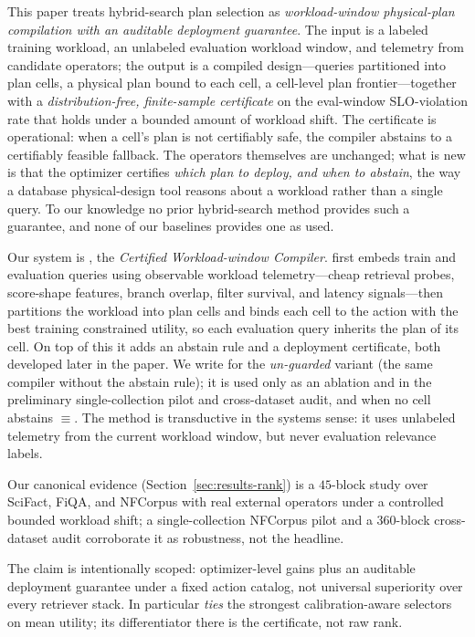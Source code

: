 This paper treats hybrid-search plan selection as \emph{workload-window physical-plan compilation with an auditable deployment guarantee}. The input is a labeled training workload, an unlabeled evaluation workload window, and telemetry from candidate operators; the output is a compiled design---queries partitioned into plan cells, a physical plan bound to each cell, a cell-level plan frontier---together with a \emph{distribution-free, finite-sample certificate} on the eval-window SLO-violation rate that holds under a bounded amount of workload shift. The certificate is operational: when a cell's plan is not certifiably safe, the compiler abstains to a certifiably feasible fallback. The operators themselves are unchanged; what is new is that the optimizer certifies \emph{which plan to deploy, and when to abstain}, the way a database physical-design tool reasons about a workload rather than a single query. To our knowledge no prior hybrid-search method provides such a guarantee, and none of our baselines provides one as used.

Our system is \CWC{}, the \emph{Certified Workload-window Compiler}. \CWC{} first embeds train and evaluation queries using observable workload telemetry---cheap retrieval probes, score-shape features, branch overlap, filter survival, and latency signals---then partitions the workload into plan cells and binds each cell to the action with the best training constrained utility, so each evaluation query inherits the plan of its cell. On top of this it adds an abstain rule and a deployment certificate, both developed later in the paper. We write \WCR{} for the \emph{un-guarded} variant (the same compiler without the abstain rule); it is used only as an ablation and in the preliminary single-collection pilot and cross-dataset audit, and when no cell abstains \CWC{}$\equiv$\WCR{}. The method is transductive in the systems sense: it uses unlabeled telemetry from the current workload window, but never evaluation relevance labels.

Our canonical evidence (Section~\ref{sec:results-rank}) is a $45$-block study over SciFact, FiQA, and NFCorpus with real external operators under a controlled bounded workload shift; a single-collection NFCorpus pilot and a $360$-block cross-dataset audit corroborate it as robustness, not the headline.

The claim is intentionally scoped: optimizer-level gains plus an auditable deployment guarantee under a fixed action catalog, not universal superiority over every retriever stack. In particular \CWC{} \emph{ties} the strongest calibration-aware selectors on mean utility; its differentiator there is the certificate, not raw rank.

